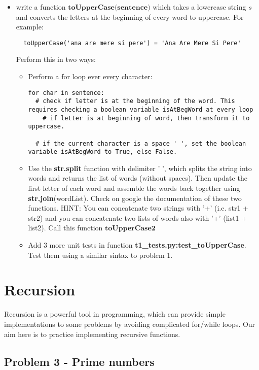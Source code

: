 \documentclass[11pt,a4paper]{report}
\begin{document}
\begin{itemize}
  \item write a function $\textbf{toUpperCase(sentence)}$ which takes a lowercase string $s$ and converts the letters at the beginning of every word to uppercase. For example: 
  \begin{lstlisting}
  toUpperCase('ana are mere si pere') = 'Ana Are Mere Si Pere'
  \end{lstlisting}   
  Perform this in two ways:
  \begin{itemize}
   \item Perform a for loop ever every character:
     \begin{lstlisting}
for char in sentence:
  # check if letter is at the beginning of the word. This requires checking a boolean variable isAtBegWord at every loop
    # if letter is at beginning of word, then transform it to uppercase. 
    
  # if the current character is a space ' ', set the boolean variable isAtBegWord to True, else False.
  \end{lstlisting}  
  \item Use the \textbf{str.split} function with delimiter ' ', which splits the string into words and returns the list of words (without spaces). Then update the first letter of each word and assemble the words back together using \textbf{str.join}(wordList). Check on google the documentation of these two functions. HINT: You can concatenate two strings with '+' (i.e. str1 + str2) and you can concatenate two lists of words also with '+' (list1 + list2). Call this function $\textbf{toUpperCase2}$
  \item Add 3 more unit tests in function \textbf{t1\_tests.py:test\_toUpperCase}. Test them using a similar sintax to problem 1.
  \end{itemize}


\end{itemize}


\section*{Recursion}

Recursion is a powerful tool in programming, which can provide simple implementations to some problems by avoiding complicated for/while loops. Our aim here is to practice implementing recursive functions.


\subsection*{Problem 3 - Prime numbers}
\end{document}
